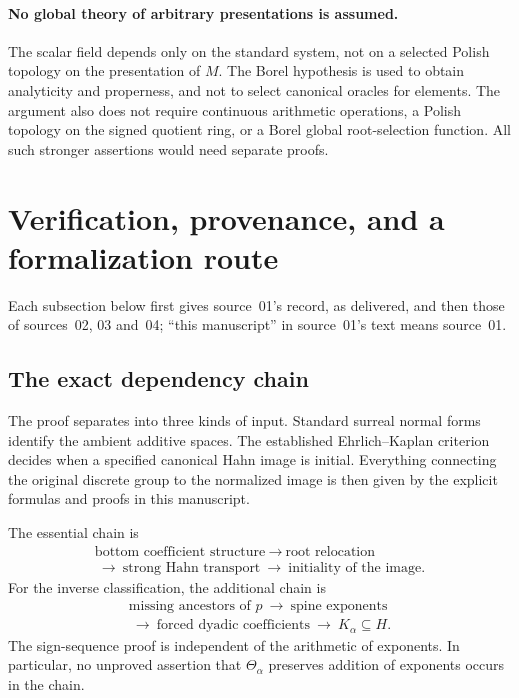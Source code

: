\documentclass[11pt]{article}
\theoremstyle{definition}
\theoremstyle{remark}
\newcommand{\tht}{\Theta_{\alpha}}
\begin{document}
\paragraph{No global theory of arbitrary presentations is assumed.} The
scalar field depends only on the standard system, not on a selected Polish
topology on the presentation of $M$. The Borel hypothesis is used to obtain
analyticity and properness, and not to select canonical oracles for
elements. The argument also does not require continuous arithmetic
operations, a Polish topology on the signed quotient ring, or a Borel
global root-selection function. All such stronger assertions would need
separate proofs.

\section{Verification, provenance, and a formalization route}\label{isg:sec:audit}

Each subsection below first gives source~01's record, as delivered, and
then those of sources~02, 03 and~04; ``this manuscript'' in source~01's text means source~01.

\subsection{The exact dependency chain}
The proof separates into three kinds of input. Standard surreal
normal forms identify the ambient additive spaces. The established
Ehrlich--Kaplan criterion decides when a specified canonical Hahn image
is initial. Everything connecting the original discrete group to the
normalized image is then given by the explicit formulas and proofs in
this manuscript.

The essential chain is
\begin{gather*}
 \text{bottom coefficient structure}
 \ \longrightarrow\ \text{root relocation}\\
 \ \longrightarrow\ \text{strong Hahn transport}
 \ \longrightarrow\ \text{initiality of the image}.
\end{gather*}
For the inverse classification, the additional chain is
\begin{gather*}
 \text{missing ancestors of }p
 \ \longrightarrow\ \text{spine exponents}\\
 \ \longrightarrow\ \text{forced dyadic coefficients}
 \ \longrightarrow\ K_\alpha\subseteq H.
\end{gather*}
The sign-sequence proof is independent of the arithmetic of exponents.
In particular, no unproved assertion that $\tht$ preserves addition of
exponents occurs in the chain.
\end{document}
